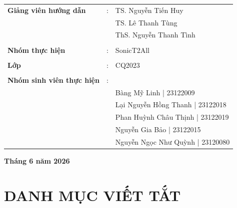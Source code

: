 \documentclass[12pt,a4paper]{report}
\begin{document}
\begin{center}
    \begin{tabular}{lll}
        \textbf{Giảng viên hướng dẫn} & : & TS. Nguyễn Tiến Huy \\
                                       & & TS. Lê Thanh Tùng \\
                                       & & ThS. Nguyễn Thanh Tình \\
                                       & & \\
        \textbf{Nhóm thực hiện}        & : & SonicT2All \\
                                       & & \\
        \textbf{Lớp}                   & : & CQ2023 \\
                                       & & \\
        \textbf{Nhóm sinh viên thực hiện} & : & \\
        & & Bàng Mỹ Linh \hspace{1.5cm}     | 23122009 \\
        & & Lại Nguyễn Hồng Thanh \hspace{0.45cm} | 23122018 \\
        & & Phan Huỳnh Châu Thịnh \hspace{0.45cm} | 23122019 \\
        & & Nguyễn Gia Bảo \hspace{1.1cm}   | 23122015 \\
        & & Nguyễn Ngọc Như Quỳnh \hspace{0.4cm} | 23120080 \\
    \end{tabular}

    \vfill
    {\Large\textbf{Tháng 6 năm 2026} \par}
\end{center}
\clearpage

\tableofcontents
\clearpage
\listoftables
\clearpage
\listoffigures
\clearpage

\chapter*{DANH MỤC VIẾT TẮT}
\end{document}
